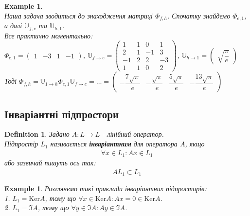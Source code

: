 \documentclass[a4paper, 10pt]{article}
\def\ker#1{\textrm{Ker} {#1}}
\theoremstyle{theoremdd}
\theoremstyle{theoremdd}
\newtheorem{definition}[theorem]{Definition}
\theoremstyle{theoremdd}
\theoremstyle{theoremdd}
\newtheorem{example}[theorem]{Example}
\theoremstyle{theoremdd}
\theoremstyle{theoremdd}
\theoremstyle{theoremdd}
\theoremstyle{theoremdd}
\begin{document}
\begin{example}
\\
Наша задача зводиться до знаходження матриці $\Phi_{f,h}$. Спочатку знайдемо $\Phi_{e,1}$, а далі $\mathbb{U}_{f,e}$ та $\mathbb{U}_{h,1}$.\\
Все практично моментально: \\
$\Phi_{e,1} = \begin{pmatrix}
1 & -3 & 1 & -1
\end{pmatrix}$, \hspace{0.5cm} $\mathbb{U}_{f \to e} = \begin{pmatrix}
1 & 1 & 0 & 1 \\
2 & 1 & -1 & 3 \\
-1 & 2 & 2 & -3 \\
1 & 1 & 0 & 2
\end{pmatrix}$, \hspace{0.5cm} $\mathbb{U}_{h \to 1} = \begin{pmatrix}
\sqrt{\dfrac{\pi}{e}}
\end{pmatrix}$\\
Тоді $\Phi_{f,h} = \mathbb{U}_{1 \to h} \Phi_{e,1} \mathbb{U}_{f \to e} = \dots = \begin{pmatrix}
-\dfrac{7\sqrt{\pi}}{e} & -\dfrac{\sqrt{\pi}}{e} & \dfrac{5\sqrt{\pi}}{e} & -\dfrac{13\sqrt{\pi}}{e}
\end{pmatrix}$
\end{example}

\subsection{Інваріантні підпростори}
\begin{definition}
Задано $A: L \to L$ - лінійний оператор.\\
Підпростір $L_1$ називається \textbf{інваріантним} для оператора $A$, якщо
\begin{align*}
\forall x \in L_1: Ax \in L_1
\end{align*}
або зазвичай пишуть ось так:
\begin{align*}
AL_1 \subset L_1
\end{align*}
\end{definition}

\begin{example} Розглянемо такі приклади інваріантних підпросторів:\\
1. $L_1 = \ker A$, тому що $\forall x \in \ker A: Ax = 0 \in \ker A$.\\
2. $L_1 = \Im A$, тому що $\forall y \in \Im A: Ay \in \Im A$.
\end{example}
\end{document}
